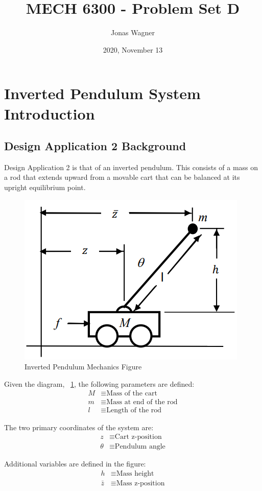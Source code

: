 \documentclass[]{article}
\title{MECH 6300 - Problem Set D}
\author{Jonas Wagner}
\date{2020, November 13}
\begin{document}
\maketitle

\section{Inverted Pendulum System Introduction}

	\subsection{Design Application 2 Background}
	
		Design Application 2 is that of an inverted pendulum. This consists of a mass on a rod that extends upward from a movable cart that can be balanced at its upright equilibrium point.
		
		\begin{figure}[h]
			\centering
			\includegraphics[width=0.5\linewidth]{Fig/DesignApplication2}
			\caption[]{Inverted Pendulum Mechanics Figure}
			\label{fig:designapplication2}
		\end{figure}
		
		Given the diagram, \figurename \ \ref{fig:designapplication2}, the following parameters are defined:
		\begin{align*}
			M &\equiv \text{Mass of the cart}\\
			m &\equiv \text{Mass at end of the rod}\\
			l &\equiv \text{Length of the rod}
		\end{align*}
		
		The two primary coordinates of the system are:
		\begin{align*}
			z &\equiv \text{Cart z-position}\\
			\theta &\equiv \text{Pendulum angle}
		\end{align*}
		
		Additional variables are defined in the figure:
		\begin{align*}
			h &\equiv \text{Mass height}\\
			\bar{z} &\equiv \text{Mass z-position}
		\end{align*} 
		
\end{document}
